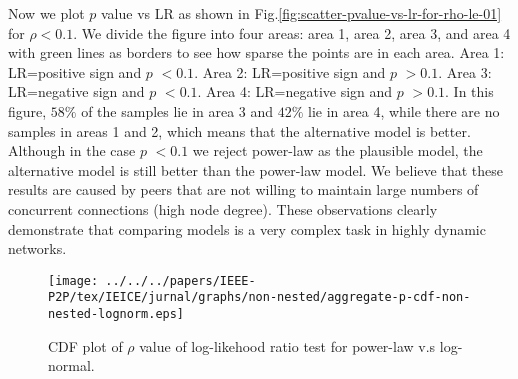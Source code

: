 Now we plot $p$ value vs LR as shown in Fig.\ref{fig:scatter-pvalue-vs-lr-for-rho-le-01} for $\rho < 0.1$.
We divide the figure into four areas: area 1, area 2, area 3, and area 4  with green lines as borders to see how sparse the points are in each area.
Area 1: LR=positive sign and $p$ $<0.1$.
Area 2: LR=positive sign and $p$ $>0.1$.
Area 3: LR=negative sign and $p$ $<0.1$.
Area 4: LR=negative sign and $p$ $>0.1$. 
In this figure, $58\%$ of the samples lie in area 3 and  $42\%$ lie in area 4, while there are no samples in areas 1 and 2, which means that the alternative model is better.
Although in the case $p$ $<0.1$ we reject power-law as the plausible model, the alternative model is still better than the power-law model. 
We believe that these results are caused by peers that are not willing to maintain large numbers of concurrent connections (high node degree).
These observations clearly demonstrate that comparing models is a very complex task in highly dynamic networks.


\begin{figure}[!tb]
\begin{center}
\texttt{[image: ../../../papers/IEEE-P2P/tex/IEICE/jurnal/graphs/non-nested/aggregate-p-cdf-non-nested-lognorm.eps]}
\end{center}
\caption{CDF plot of $\rho$ value of log-likehood ratio test for power-law v.s 
         log-normal.} %
\label{fig:cdf-p-lognorm}
\end{figure}

